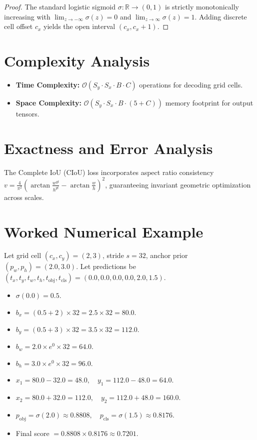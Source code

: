 \documentclass[11pt,a4paper]{article}
\theoremstyle{definition}
\begin{document}
\begin{proof}
The standard logistic sigmoid $\sigma: \mathbb{R} \to (0, 1)$ is strictly monotonically increasing with $\lim_{z \to -\infty} \sigma(z) = 0$ and $\lim_{z \to \infty} \sigma(z) = 1$. Adding discrete cell offset $c_x$ yields the open interval $(c_x, c_x + 1)$.
\end{proof}

\section{Complexity Analysis}

\begin{itemize}
    \item \textbf{Time Complexity:} $\mathcal{O}(S_y \cdot S_x \cdot B \cdot C)$ operations for decoding grid cells.
    \item \textbf{Space Complexity:} $\mathcal{O}(S_y \cdot S_x \cdot B \cdot (5 + C))$ memory footprint for output tensors.
\end{itemize}

\section{Exactness and Error Analysis}

The Complete IoU (CIoU) loss incorporates aspect ratio consistency $v = \frac{4}{\pi^2} (\arctan \frac{w^{gt}}{h^{gt}} - \arctan \frac{w}{h})^2$, guaranteeing invariant geometric optimization across scales.

\section{Worked Numerical Example}

Let grid cell $(c_x, c_y) = (2, 3)$, stride $s = 32$, anchor prior $(p_w, p_h) = (2.0, 3.0)$.
Let predictions be $(t_x, t_y, t_w, t_h, t_{\text{obj}}, t_{\text{cls}}) = (0.0, 0.0, 0.0, 0.0, 2.0, 1.5)$.
\begin{itemize}
    \item $\sigma(0.0) = 0.5$.
    \item $b_x = (0.5 + 2) \times 32 = 2.5 \times 32 = 80.0$.
    \item $b_y = (0.5 + 3) \times 32 = 3.5 \times 32 = 112.0$.
    \item $b_w = 2.0 \times e^0 \times 32 = 64.0$.
    \item $b_h = 3.0 \times e^0 \times 32 = 96.0$.
    \item $x_1 = 80.0 - 32.0 = 48.0, \quad y_1 = 112.0 - 48.0 = 64.0$.
    \item $x_2 = 80.0 + 32.0 = 112.0, \quad y_2 = 112.0 + 48.0 = 160.0$.
    \item $p_{\text{obj}} = \sigma(2.0) \approx 0.8808, \quad p_{\text{cls}} = \sigma(1.5) \approx 0.8176$.
    \item Final score $= 0.8808 \times 0.8176 \approx 0.7201$.
\end{itemize}
\end{document}
